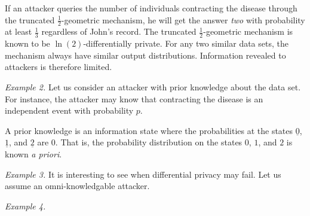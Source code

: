 If an attacker queries the number of individuals contracting the
disease through the truncated $\frac{1}{2}$-geometric mechanism, 
he will get the answer \textit{two} with probability at least
$\frac{1}{3}$ regardless of John's record. The truncated
$\frac{1}{2}$-geometric mechanism is known to be
$\ln(2)$-differentially private. For any two similar data sets, the
mechanism always have similar output distributions. Information
revealed to attackers is therefore limited.

\noindent
\textit{Example 2.}
Let us consider an attacker with prior knowledge about the data
set. For instance, the attacker may know that contracting the disease
is an independent event with probability $p$.

A prior knowledge is an
information state where the probabilities at the states $\underline{0}$,
$\underline{1}$, and $\underline{2}$ are $0$. That is, the probability
distribution on the states $0$, $1$, and $2$ is known \emph{a priori}.



\noindent
\textit{Example 3.}
It is interesting to see when differential privacy may fail. Let us
assume an omni-knowledgable attacker.



\noindent
\textit{Example 4.}
